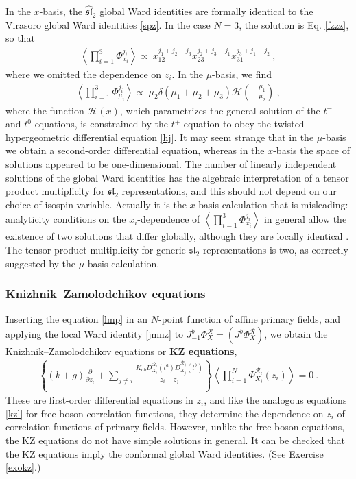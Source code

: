 \documentclass[12pt, a4paper, notitlepage, twoside]{report}
\numberwithin{equation}{section}
\theoremstyle{break}
\begin{document}
In the $x$-basis, the $\widehat{\mathfrak{sl}}_2$ global Ward identities are formally identical to the Virasoro global Ward identities \eqref{spz}. In the case $N=3$, the solution is Eq. \eqref{fzzz}, so that 
\begin{align}
 \left\langle \prod_{i=1}^3 \Phi^{j_i}_{x_i} \right\rangle \propto\ x_{12}^{j_1+j_2-j_3} x_{23}^{j_2+j_3-j_1} x_{31}^{j_3+j_1-j_2}\ ,
\label{xxx}
\end{align}
where we omitted the dependence on $z_i$.
In the $\mu$-basis, we find 
\begin{align}
 \left\langle \prod_{i=1}^3\Phi^{j_i}_{\mu_i}\right\rangle \propto\ \mu_2\delta(\mu_1+\mu_2+\mu_3) \mathcal{H}\left(-\frac{\mu_1}{\mu_2}\right)\ ,
\label{pmf}
\end{align}
where the function $\mathcal{H}(x)$, which parametrizes the general solution of the $t^-$ and $t^0$ equations, is constrained by the $t^+$ equation to obey the twisted hypergeometric differential equation \eqref{hj}.
It may seem strange that in the $\mu$-basis we obtain a second-order differential equation, whereas in the $x$-basis the space of solutions appeared to be one-dimensional.
The number of linearly independent solutions of the global Ward identities has the algebraic interpretation of a tensor product multiplicity for $\mathfrak{sl}_2$ representations, and this should not depend on our choice of isospin variable.
Actually it is the $x$-basis calculation that is misleading: analyticity conditions on the $x_i$-dependence of $\left\langle \prod_{i=1}^3 \Phi^{j_i}_{x_i} \right\rangle$ in general allow the existence of two solutions that differ globally, although they are locally identical \cite{rib09}.
The tensor product multiplicity for generic $\mathfrak{sl}_2$ representations is two, as correctly suggested by the $\mu$-basis calculation. 

\subsubsection{Knizhnik--Zamolodchikov equations}

Inserting the equation \eqref{lmp} in an $N$-point function of affine primary fields, and applying the local Ward identity \eqref{jmnz} to $J^b_{-1}\Phi^\mathcal{R}_X = (J^b\Phi^\mathcal{R}_X)$, we obtain the Knizhnik--Zamolodchikov equations or \textbf{\boldmath KZ equations},
\begin{align}
 \boxed{\left\{(k+g){\frac{\partial}{\partial z_i}} + \sum_{j\neq i} \frac{K_{ab}D_{X_i}^{\mathcal{R}_i}(t^a)D_{X_j}^{\mathcal{R}_j}(t^b)}{z_i-z_j}\right\}\left\langle \prod_{i=1}^N \Phi^{\mathcal{R}_i}_{X_i}(z_i)\right\rangle  = 0}\ .
\label{kz} 
\end{align}
These are first-order differential equations in $z_i$, and like the analogous equations \eqref{kzl} for free boson correlation functions, they determine the dependence on $z_i$ of correlation functions of primary fields.
However, unlike the free boson equations, the KZ equations do not have simple solutions in general. 
It can be checked that the KZ equations imply the conformal global Ward identities. (See Exercise \ref{exokz}.)
\end{document}
